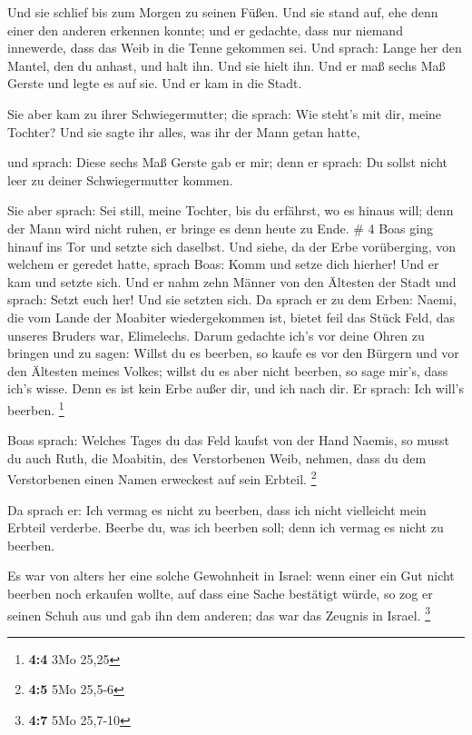  Und sie schlief bis zum Morgen zu seinen Füßen. Und sie
stand auf, ehe denn einer den anderen erkennen konnte; und er gedachte,
dass nur niemand innewerde, dass das Weib in die Tenne gekommen sei.
 Und sprach: Lange her den Mantel, den du anhast, und halt
ihn. Und sie hielt ihn. Und er maß sechs Maß Gerste und legte es auf
sie. Und er kam in die Stadt.

 Sie aber kam zu ihrer Schwiegermutter; die sprach: Wie
steht's mit dir, meine Tochter? Und sie sagte ihr alles, was ihr der
Mann getan hatte,

 und sprach: Diese sechs Maß Gerste gab er mir; denn er
sprach: Du sollst nicht leer zu deiner Schwiegermutter kommen.

 Sie aber sprach: Sei still, meine Tochter, bis du
erfährst, wo es hinaus will; denn der Mann wird nicht ruhen, er bringe
es denn heute zu Ende. \# 4  Boas ging hinauf ins Tor und
setzte sich daselbst. Und siehe, da der Erbe vorüberging, von welchem er
geredet hatte, sprach Boas: Komm und setze dich hierher! Und er kam und
setzte sich.  Und er nahm zehn Männer von den Ältesten der
Stadt und sprach: Setzt euch her! Und sie setzten sich.  Da
sprach er zu dem Erben: Naemi, die vom Lande der Moabiter wiedergekommen
ist, bietet feil das Stück Feld, das unseres Bruders war, Elimelechs.
 Darum gedachte ich's vor deine Ohren zu bringen und zu
sagen: Willst du es beerben, so kaufe es vor den Bürgern und vor den
Ältesten meines Volkes; willst du es aber nicht beerben, so sage mir's,
dass ich's wisse. Denn es ist kein Erbe außer dir, und ich nach dir. Er
sprach: Ich will's beerben. \footnote{\textbf{4:4} 3Mo 25,25}

 Boas sprach: Welches Tages du das Feld kaufst von der Hand
Naemis, so musst du auch Ruth, die Moabitin, des Verstorbenen Weib,
nehmen, dass du dem Verstorbenen einen Namen erweckest auf sein Erbteil.
\footnote{\textbf{4:5} 5Mo 25,5-6}

 Da sprach er: Ich vermag es nicht zu beerben, dass ich
nicht vielleicht mein Erbteil verderbe. Beerbe du, was ich beerben soll;
denn ich vermag es nicht zu beerben.

 Es war von alters her eine solche Gewohnheit in Israel:
wenn einer ein Gut nicht beerben noch erkaufen wollte, auf dass eine
Sache bestätigt würde, so zog er seinen Schuh aus und gab ihn dem
anderen; das war das Zeugnis in Israel. \footnote{\textbf{4:7} 5Mo
  25,7-10}

